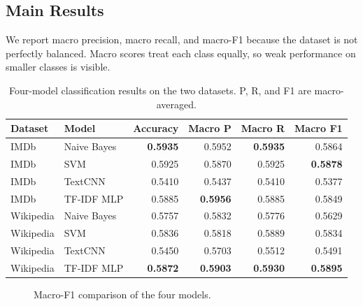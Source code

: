\documentclass[12pt,a4paper]{article}
\begin{document}
\subsection{Main Results}
We report macro precision, macro recall, and macro-F1 because the dataset is not perfectly balanced. Macro scores treat each class equally, so weak performance on smaller classes is visible.

\begin{table}[H]
\centering
\begin{tabular}{llrrrr}
\toprule
\textbf{Dataset} & \textbf{Model} & \textbf{Accuracy} & \textbf{Macro P} & \textbf{Macro R} & \textbf{Macro F1} \\
\midrule
IMDb & Naive Bayes & \textbf{0.5935} & 0.5952 & \textbf{0.5935} & 0.5864 \\
IMDb & SVM & 0.5925 & 0.5870 & 0.5925 & \textbf{0.5878} \\
IMDb & TextCNN & 0.5410 & 0.5437 & 0.5410 & 0.5377 \\
IMDb & TF-IDF MLP & 0.5885 & \textbf{0.5956} & 0.5885 & 0.5849 \\
\midrule
Wikipedia & Naive Bayes & 0.5757 & 0.5832 & 0.5776 & 0.5629 \\
Wikipedia & SVM & 0.5836 & 0.5818 & 0.5889 & 0.5834 \\
Wikipedia & TextCNN & 0.5450 & 0.5703 & 0.5512 & 0.5491 \\
Wikipedia & TF-IDF MLP & \textbf{0.5872} & \textbf{0.5903} & \textbf{0.5930} & \textbf{0.5895} \\
\bottomrule
\end{tabular}
\caption{Four-model classification results on the two datasets. P, R, and F1 are macro-averaged.}
\label{tab:main_results}
\end{table}

\begin{figure}[H]
\centering
{}
\caption{Macro-F1 comparison of the four models.}
\label{fig:f1_comparison}
\end{figure}
\end{document}
